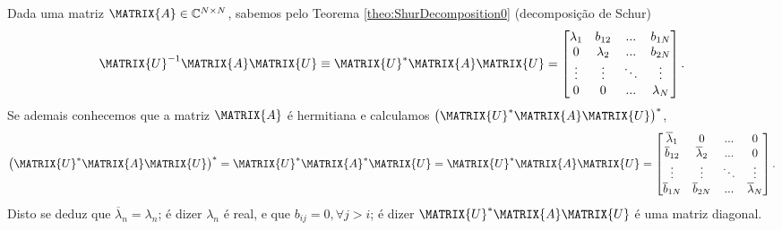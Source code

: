 \begin{myproofT}\label{proof:theo:HermitianDDecomposition0}
Dada uma matriz $\MATRIX{A} \in \mathbb{C}^{N \times N}$,
sabemos pelo Teorema \ref{theo:ShurDecomposition0} (decomposição de Schur)
\begin{equation}
\MATRIX{U}^{-1} \MATRIX{A} \MATRIX{U} \equiv
\MATRIX{U}^{\ast} \MATRIX{A} \MATRIX{U} =
\begin{bmatrix}
\lambda_1 & b_{12}    & ...    & b_{1N} \\
0         & \lambda_2 & ...    & b_{2N} \\
\vdots    & \vdots    & \ddots & \vdots \\
0         & 0         & ...    & \lambda_N
\end{bmatrix}.
\end{equation}
Se ademais conhecemos que a matriz $\MATRIX{A}$ é hermitiana  
e calculamos $\left(\MATRIX{U}^{\ast} \MATRIX{A} \MATRIX{U}\right)^{\ast}$,
\begin{equation}
\left(\MATRIX{U}^{\ast} \MATRIX{A} \MATRIX{U}\right)^{\ast} =
\MATRIX{U}^{\ast} \MATRIX{A}^{\ast} \MATRIX{U}  =
\MATRIX{U}^{\ast} \MATRIX{A} \MATRIX{U} =
\begin{bmatrix}
\overline{\lambda}_1 & 0                    & ...    & 0 \\
\overline{b}_{12}    & \overline{\lambda}_2 & ...    & 0 \\
\vdots               & \vdots               & \ddots & \vdots \\
\overline{b}_{1N}    & \overline{b}_{2N}    & ...    & \overline{\lambda}_N
\end{bmatrix}.
\end{equation}
Disto se deduz que $\overline{\lambda}_n=\lambda_n$; é dizer $\lambda_n$ é real,
e que  $b_{ij}=0, \forall j>i$; é dizer $\MATRIX{U}^{\ast} \MATRIX{A} \MATRIX{U}$
é uma matriz diagonal.
\end{myproofT}


